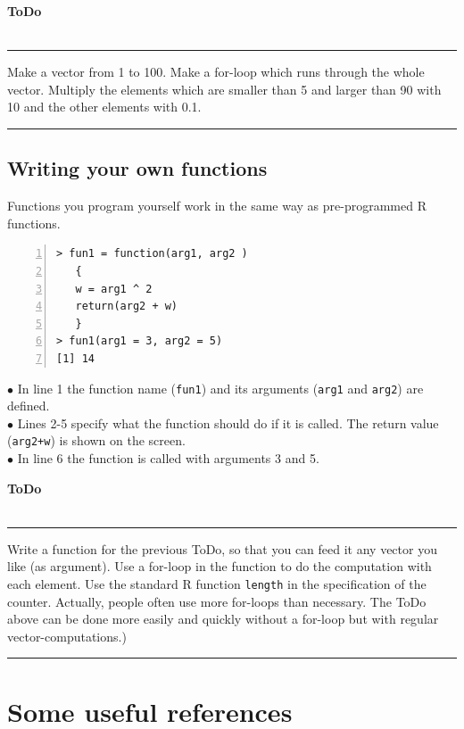 \documentclass[a4paper,11pt,twocolumn,tablecaptionabove]{scrartcl}
\makeatletter
\newenvironment{ToDo} {%
  \begin{flushright}
    \hfill
    \begin{minipage}{0.95\columnwidth}         %
    \textsf{\textbf{ToDo}} \\
      \vspace{-0.85cm}\\
      {\color{Gray}\rule[-0.1cm]{\columnwidth}{1.5pt}}} { %
      {\color{Gray} \rule[0.3cm]{\columnwidth}{1.5pt}}
    \end{minipage}
    \vspace{1em}
  \end{flushright}
  }
\let\SF@@footnote\footnote
\def\footnote{\ifx\protect\@typeset@protect
 \expandafter\SF@@footnote
 \else
 \expandafter\SF@gobble@opt
 \fi
}
\edef\SF@gobble@opt{\noexpand\protect
 \expandafter\noexpand\csname SF@gobble@opt \endcsname}
\makeatother
\begin{document}
\begin{ToDo}
Make a vector from 1 to 100. Make a for-loop which runs through the whole vector. Multiply the elements which are smaller than 5 and larger than 90 with 10 and the other elements with 0.1.
\end{ToDo}

\subsection{Writing your own functions}
\label{sec:progfunc}

Functions you program yourself work in the same way as pre-programmed R functions.

\begin{Verbatim}[frame=single,numbers=left,gobble=0, xleftmargin=0.35cm, numbersep=0.1cm]
> fun1 = function(arg1, arg2 )
   {
   w = arg1 ^ 2
   return(arg2 + w)
   }
> fun1(arg1 = 3, arg2 = 5) 
[1] 14

\end{Verbatim}

\noindent $\bullet$ In line 1 the function name (\texttt{fun1}) and its arguments (\texttt{arg1} and \texttt{arg2}) are defined. \\
\noindent $\bullet$ Lines 2-5 specify what the function should do if it is called. The return value (\texttt{arg2+w}) is shown on the screen. \\
\noindent $\bullet$ In line 6 the function is called with arguments 3 and 5.

\begin{ToDo}
Write a function for the previous ToDo, so that you can feed it any vector you like (as argument). Use a for-loop in the function to do the computation with each element. Use the standard R function \texttt{length} in the specification of the counter. \footnote{Actually, people often use more for-loops than necessary. The ToDo above can be done more easily and quickly without a for-loop but with regular vector-computations.})
\end{ToDo}

\newpage


\section{Some useful references}
\end{document}
